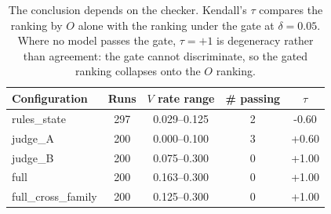 \begin{table}[t]
\caption{The conclusion depends on the checker. Kendall's $\tau$ compares the ranking by $O$ alone with the ranking under the gate at $\delta=0.05$. Where no model passes the gate, $\tau=+1$ is degeneracy rather than agreement: the gate cannot discriminate, so the gated ranking collapses onto the $O$ ranking.}
\label{tab:configs}
\vskip 0.1in
\begin{center}\begin{small}
\begin{tabular}{lcccc}
\toprule
Configuration & Runs & $V$ rate range & \# passing & $\tau$ \\
\midrule
rules\_state & 297 & 0.029--0.125 & 2 & -0.60 \\
judge\_A & 200 & 0.000--0.100 & 3 & +0.60 \\
judge\_B & 200 & 0.075--0.300 & 0 & +1.00 \\
full & 200 & 0.163--0.300 & 0 & +1.00 \\
full\_cross\_family & 200 & 0.125--0.300 & 0 & +1.00 \\
\bottomrule
\end{tabular}
\end{small}\end{center}
\vskip -0.1in
\end{table}
